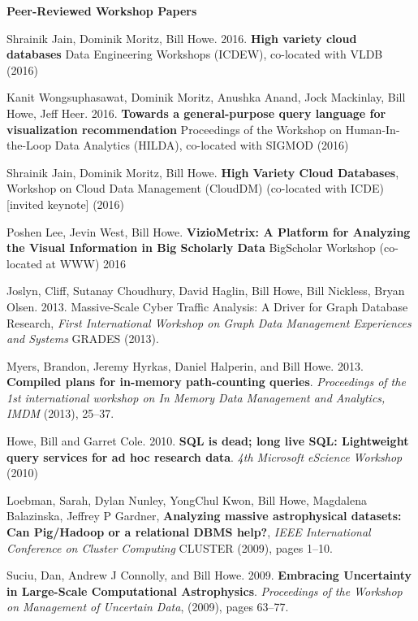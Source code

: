 {\bf Peer-Reviewed Workshop Papers}
\begin{bulletlist}

\item Shrainik Jain, Dominik Moritz, Bill Howe. 2016.
\textbf{High variety cloud databases}
Data Engineering Workshops (ICDEW), co-located with VLDB (2016)

\item Kanit Wongsuphasawat, Dominik Moritz, Anushka Anand, Jock Mackinlay, Bill Howe, Jeff Heer. 2016.
\textbf{Towards a general-purpose query language for visualization recommendation}
Proceedings of the Workshop on Human-In-the-Loop Data Analytics (HILDA), co-located with SIGMOD (2016)

\item  Shrainik Jain, Dominik Moritz, Bill Howe. \textbf{High Variety Cloud Databases},  
Workshop on Cloud Data Management (CloudDM) (co-located with ICDE) [invited keynote] (2016)

\item Poshen Lee, Jevin West, Bill Howe. 
\textbf{VizioMetrix: A Platform for Analyzing the Visual Information in Big Scholarly Data}
BigScholar Workshop (co-located at WWW) 2016

\item Joslyn, Cliff, Sutanay Choudhury, David Haglin, Bill Howe, Bill Nickless, Bryan Olsen. 2013. Massive-Scale Cyber Traffic Analysis: A Driver for Graph Database Research,
\emph{First International Workshop on Graph Data Management Experiences and Systems} GRADES (2013).

\item Myers, Brandon, Jeremy Hyrkas, Daniel Halperin, and Bill
Howe. 2013. \textbf{Compiled plans for in-memory path-counting queries}.
\emph{Proceedings of the 1st international workshop on In Memory Data
Management and Analytics, IMDM} (2013), 25--37. 

\item Howe, Bill and Garret Cole. 2010. 
\textbf{SQL is dead; long live SQL: Lightweight query services for ad hoc research data}.
\emph{4th Microsoft eScience Workshop} (2010)

\item Loebman, Sarah, Dylan Nunley, YongChul Kwon, Bill Howe, Magdalena Balazinska, Jeffrey P Gardner, \textbf{Analyzing massive astrophysical datasets: Can Pig/Hadoop or a relational DBMS help?}, 
\emph{IEEE International Conference on Cluster Computing} CLUSTER (2009), pages 1--10.

\item Suciu, Dan, Andrew J Connolly, and Bill Howe. 2009. 
\textbf{Embracing Uncertainty in Large-Scale Computational Astrophysics}.
\emph{Proceedings of the Workshop on Management of Uncertain Data}, (2009),
  pages 63--77.


\end{bulletlist}
